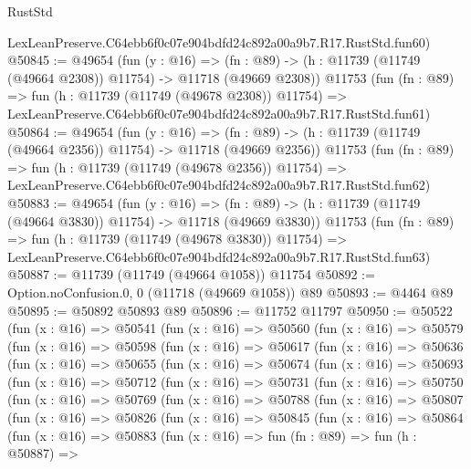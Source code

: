 \begin{lexlean}{RustStd}
\begin{coremodule}
    LexLeanPreserve.C64ebb6f0c07e904bdfd24c892a00a9b7.R17.RustStd.fun60)
@50845 := @49654
    (fun (y : @16) =>
    (fn : @89) -> (h : @11739 (@11749 (@49664 @2308)) @11754) -> @11718 (@49669 @2308))
    @11753
    (fun (fn : @89) =>
    fun (h : @11739 (@11749 (@49678 @2308)) @11754) =>
    LexLeanPreserve.C64ebb6f0c07e904bdfd24c892a00a9b7.R17.RustStd.fun61)
@50864 := @49654
    (fun (y : @16) =>
    (fn : @89) -> (h : @11739 (@11749 (@49664 @2356)) @11754) -> @11718 (@49669 @2356))
    @11753
    (fun (fn : @89) =>
    fun (h : @11739 (@11749 (@49678 @2356)) @11754) =>
    LexLeanPreserve.C64ebb6f0c07e904bdfd24c892a00a9b7.R17.RustStd.fun62)
@50883 := @49654
    (fun (y : @16) =>
    (fn : @89) -> (h : @11739 (@11749 (@49664 @3830)) @11754) -> @11718 (@49669 @3830))
    @11753
    (fun (fn : @89) =>
    fun (h : @11739 (@11749 (@49678 @3830)) @11754) =>
    LexLeanPreserve.C64ebb6f0c07e904bdfd24c892a00a9b7.R17.RustStd.fun63)
@50887 := @11739 (@11749 (@49664 @1058)) @11754
@50892 := Option.noConfusion.{0, 0} (@11718 (@49669 @1058)) @89
@50893 := @4464 @89
@50895 := @50892 @50893 @89
@50896 := @11752 @11797
@50950 := @50522
    (fun (x : @16) =>
    @50541
      (fun (x : @16) =>
      @50560
        (fun (x : @16) =>
        @50579
          (fun (x : @16) =>
          @50598
            (fun (x : @16) =>
            @50617
              (fun (x : @16) =>
              @50636
                (fun (x : @16) =>
                @50655
                  (fun (x : @16) =>
                  @50674
                    (fun (x : @16) =>
                    @50693
                      (fun (x : @16) =>
                      @50712
                        (fun (x : @16) =>
                        @50731
                          (fun (x : @16) =>
                          @50750
                            (fun (x : @16) =>
                            @50769
                              (fun (x : @16) =>
                              @50788
                                (fun (x : @16) =>
                                @50807
                                  (fun (x : @16) =>
                                  @50826
                                    (fun (x : @16) =>
                                    @50845
                                      (fun (x : @16) =>
                                      @50864
                                        (fun (x : @16) =>
                                        @50883
                                          (fun (x : @16) =>
                                          fun (fn : @89) =>
                                          fun (h : @50887) =>

\end{coremodule}
\end{lexlean}

